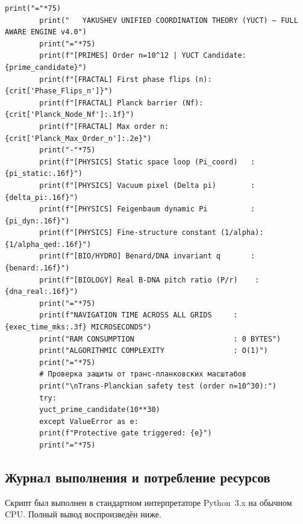 \documentclass[12pt,a4paper]{article}
\begin{document}
\begin{lstlisting}[caption={Полный координационный движок YUCT v4.0 (\texttt{yuct\_constants.py}).}, label={lst:yuct-engine}]
		print("="*75)
		print("   YAKUSHEV UNIFIED COORDINATION THEORY (YUCT) — FULL AWARE ENGINE v4.0")
		print("="*75)
		print(f"[PRIMES] Order n=10^12 | YUCT Candidate: {prime_candidate}")
		print(f"[FRACTAL] First phase flips (n): {crit['Phase_Flips_n']}")
		print(f"[FRACTAL] Planck barrier (Nf): {crit['Planck_Node_Nf']:.1f}")
		print(f"[FRACTAL] Max order n: {crit['Planck_Max_Order_n']:.2e}")
		print("-"*75)
		print(f"[PHYSICS] Static space loop (Pi_coord)   : {pi_static:.16f}")
		print(f"[PHYSICS] Vacuum pixel (Delta pi)        : {delta_pi:.16f}")
		print(f"[PHYSICS] Feigenbaum dynamic Pi          : {pi_dyn:.16f}")
		print(f"[PHYSICS] Fine-structure constant (1/alpha): {1/alpha_qed:.16f}")
		print(f"[BIO/HYDRO] Benard/DNA invariant q       : {benard:.16f}")
		print(f"[BIOLOGY] Real B-DNA pitch ratio (P/r)    : {dna_real:.16f}")
		print("="*75)
		print(f"NAVIGATION TIME ACROSS ALL GRIDS     : {exec_time_mks:.3f} MICROSECONDS")
		print("RAM CONSUMPTION                       : 0 BYTES")
		print("ALGORITHMIC COMPLEXITY                : O(1)")
		print("="*75)
		# Проверка защиты от транс-планковских масштабов
		print("\nTrans-Planckian safety test (order n=10^30):")
		try:
		yuct_prime_candidate(10**30)
		except ValueError as e:
		print(f"Protective gate triggered: {e}")
		print("="*75)
	\end{lstlisting}
	
	\subsection{Журнал выполнения и потребление ресурсов}
	
	Скрипт был выполнен в стандартном интерпретаторе Python~3.x на обычном CPU. Полный вывод воспроизведён ниже.
	
\end{document}
